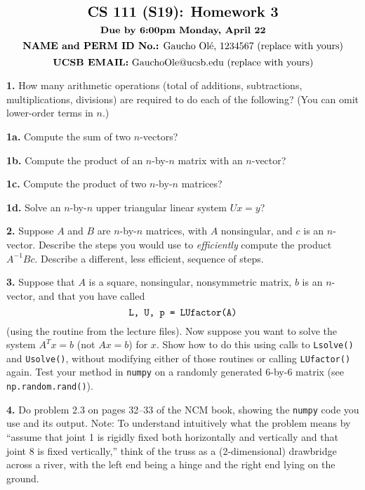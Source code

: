 \documentclass[11pt]{article}
\begin{document}
$$\mbox{\Large \textbf {CS 111 (S19): Homework 3}}$$
$$\mbox{\textbf {Due by 6:00pm Monday, April 22}}$$
$$\mbox{\textbf {NAME and PERM ID No.:} Gaucho Ol\'e, 1234567 (replace with yours)}$$
$$\mbox{\textbf {UCSB EMAIL:} GauchoOle@ucsb.edu (replace with yours)}$$

\par\bigskip
{\bf 1.}
How many arithmetic operations 
(total of additions, subtractions, multiplications, divisions)
are required to do each of the following?
(You can omit lower-order terms in $n$.)

\par\medskip
{\bf 1a.} Compute the sum of two $n$-vectors?

\par\medskip
{\bf 1b.} Compute the product of an $n$-by-$n$ matrix with an $n$-vector?

\par\medskip
{\bf 1c.} Compute the product of two $n$-by-$n$ matrices?

\par\medskip
{\bf 1d.} Solve an $n$-by-$n$ upper triangular linear system $Ux=y$?


\par\bigskip
{\bf 2.}
Suppose $A$ and $B$ are $n$-by-$n$ matrices, with $A$ nonsingular,
and $c$ is an $n$-vector.
Describe the steps you would use to {\em efficiently} compute the
product $A^{-1}Bc$.
Describe a different, less efficient, sequence of steps.


\par\bigskip
{\bf 3.}
Suppose that $A$ is a square, nonsingular, nonsymmetric matrix, 
$b$ is an $n$-vector, and that you have called 
$$\mbox{\tt L, U, p = LUfactor(A)}$$
(using the routine from the lecture files).
Now suppose you want to solve the system $A^Tx=b$ (not $Ax=b$) for $x$.
Show how to do this using calls to {\tt Lsolve()} and {\tt Usolve()},
without modifying either of those routines or calling {\tt LUfactor()} again.
Test your method in {\tt numpy} on a randomly generated 6-by-6 matrix
(see {\tt np.random.rand()}).


\par\bigskip
{\bf 4.} Do problem 2.3 on pages 32--33 of the NCM book, 
showing the {\tt numpy} code you use and its output. 
Note: To understand intuitively what the problem means by 
``assume that joint 1 is rigidly fixed both horizontally and vertically 
and that joint 8 is fixed vertically,'' 
think of the truss as a (2-dimensional) drawbridge across a river, 
with the left end being a hinge and the right end lying on the ground.
\end{document}
